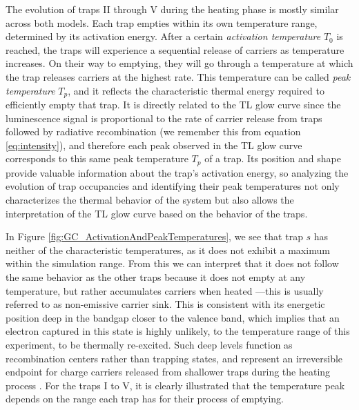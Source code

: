 \vspace{10pt}

The evolution of traps II through V during the heating phase is mostly similar across both models. Each trap empties within its own temperature range, determined by its activation energy. After a certain \textit{activation temperature} $T_0$ is reached, the traps will experience a sequential release of carriers as temperature increases. On their way to emptying, they will go through a temperature at which the trap releases carriers at the highest rate. This temperature can be called \textit{peak temperature} $T_p$, and it reflects the characteristic thermal energy required to efficiently empty that trap. It is directly related to the TL glow curve since the luminescence signal is proportional to the rate of carrier release from traps followed by radiative recombination (we remember this from equation \ref{eq:intensity}), and therefore each peak observed in the TL glow curve corresponds to this same peak temperature $T_p$ of a trap. Its position and shape provide valuable information about the trap's activation energy, so analyzing the evolution of trap occupancies and identifying their peak temperatures not only characterizes the thermal behavior of the system but also allows the interpretation of the TL glow curve based on the behavior of the traps.

\vspace{10pt}

In Figure \ref{fig:GC_ActivationAndPeakTemperatures}, we see that trap $s$ has neither of the characteristic temperatures, as it does not exhibit a maximum within the simulation range. From this we can interpret that it does not follow the same behavior as the other traps because it does not empty at any temperature, but rather accumulates carriers when heated ---this is usually referred to as non-emissive carrier sink. This is consistent with its energetic position deep in the bandgap closer to the valence band, which implies that an electron captured in this state is highly unlikely, to the temperature range of this experiment, to be thermally re-excited. Such deep levels function as recombination centers rather than trapping states, and represent an irreversible endpoint for charge carriers released from shallower traps during the heating process \cite{mckeever_course_2022}. For the traps I to V, it is clearly illustrated that the temperature peak depends on the range each trap has for their process of emptying.

\vspace{10pt}

